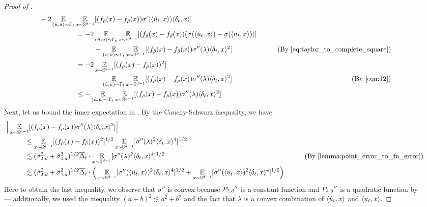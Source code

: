 \begin{proof}[Proof of ]
\begin{align}
& -2 \E_{(\uhat, \ubar) \sim \coup_t} \E_{x \sim \bbS^{d - 1}} [(f_{\rhohat}(x) - f_{\rhobar}(x)) \sigma'(\langle \uhat_t, x \rangle) \langle \delta_t, x \rangle] \\
& \nextlinespace\nextlinespace = -2 \E_{(\uhat, \ubar) \sim \coup_t} \E_{x \sim \bbS^{d - 1}} [(f_{\rhohat}(x) - f_{\rhobar}(x)) (\sigma(\langle \uhat_t, x \rangle) - \sigma(\langle \ubar_t, x \rangle))] \\
& \nextlinespace\nextlinespace\nextlinespace - \E_{(\uhat, \ubar) \sim \coup_t} \E_{x \sim \bbS^{d - 1}} [(f_{\rhohat}(x) - f_{\rhobar}(x)) \sigma''(\lambda) \langle \delta_t, x \rangle^2]
& \tag{By \Cref{eq:taylor_to_complete_square}} \\
& \nextlinespace\nextlinespace = -2 \E_{x \sim \bbS^{d - 1}} [(f_{\rhohat}(x) - f_{\rhobar}(x))^2] \\
& \nextlinespace\nextlinespace\nextlinespace - \E_{(\uhat, \ubar) \sim \coup_t} \E_{x \sim \bbS^{d - 1}} [(f_{\rhohat}(x) - f_{\rhobar}(x)) \sigma''(\lambda) \langle \delta_t, x \rangle^2]
& \tag{By \Cref{eqn:12}} \\
& \nextlinespace\nextlinespace \leq - \E_{(\uhat, \ubar) \sim \coup_t} \E_{x \sim \bbS^{d - 1}} [(f_{\rhohat}(x) - f_{\rhobar}(x)) \sigma''(\lambda) \langle \delta_t, x \rangle^2]
& \label{eq:completing_square}
\end{align}
Next, let us bound the inner expectation in . By the Cauchy-Schwarz inequality, we have
\begin{align}
& \Big| \E_{x \sim \bbS^{d - 1}} [(f_{\rhohat}(x) - f_{\rhobar}(x)) \sigma''(\lambda) \langle \delta_t, x \rangle^2] \Big| \\
& \nextlinespace \leq \E_{x \sim \bbS^{d - 1}} [(f_{\rhohat}(x) - f_{\rhobar}(x))^2]^{1/2} \E_{x \sim \bbS^{d - 1}} [\sigma''(\lambda)^2 \langle \delta_t, x \rangle^4]^{1/2} \\
& \nextlinespace \lesssim (\sigmaCoeffTwo^2 + \sigmaCoeffFour^2)^{1/2} \deltaBar_t \cdot \E_{x \sim \bbS^{d - 1}} [\sigma''(\lambda)^2 \langle \delta_t, x \rangle^4]^{1/2}
& \tag{By \Cref{lemma:point_error_to_fn_error}} \\
& \nextlinespace \lesssim (\sigmaCoeffTwo^2 + \sigmaCoeffFour^2)^{1/2} \deltaBar_t \cdot \Big(\E_{x \sim \bbS^{d - 1}} [\sigma''(\langle \uhat_t, x \rangle)^2 \langle \delta_t, x \rangle^4]^{1/2} 
+ \E_{x \sim \bbS^{d - 1}} [\sigma''(\langle \ubar_t, x \rangle)^2 \langle \delta_t, x \rangle^4]^{1/2} \Big)
\end{align}
Here to obtain the last inequality, we observe that $\sigma''$ is convex because ${P_{2, d}}''$ is a constant function and ${P_{4, d}}''$ is a quadratic function by  --- additionally, we used the inequality $(a + b)^2 \lesssim a^2 + b^2$ and the fact that $\lambda$ is a convex combination of $\langle \hat{u}_t, x \rangle$ and $\langle \bar{u}_t, x \rangle$.


\end{proof}
